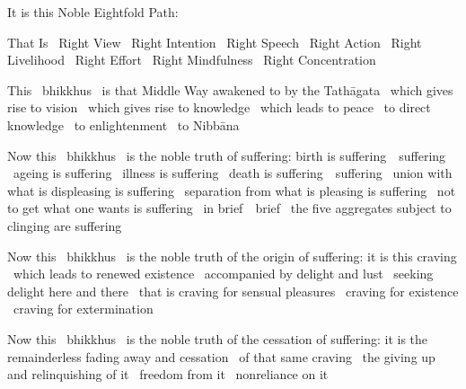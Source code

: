 \begin{english-only-hang}
  It is this Noble Eightfold Path:
\end{english-only-hang}

\begin{english-only-hang}
  That Is \breathmark\ Right View \breathmark\ Right Intention \breathmark\ Right Speech \breathmark\ Right Action \breathmark\ Right Livelihood \breathmark\ Right Effort \breathmark\ Right Mindfulness \breathmark\ Right Concentration
\end{english-only-hang}

\begin{english-only-hang}
  This \breathmark\ bhikkhus \breathmark\ is that Middle Way awakened to by the Tathāgata \breathmark\ which gives rise to vision \breathmark\ which gives rise to knowledge \breathmark\ which leads to peace \breathmark\ to direct knowledge \breathmark\ to enlightenment \breathmark\ to Nibbāna
\end{english-only-hang}

\begin{english-only-hang}
  Now this \breathmark\ bhikkhus \breathmark\ is the noble truth of suffering: birth is \ifbfiveversion \mbox{suffering}~\breathmark\ \else suffering \breathmark\ \fi ageing is suffering \breathmark\ illness is suffering \breathmark\ death is \ifbfiveversion \mbox{suffering}~\breathmark\ \else suffering \breathmark\ \fi union with what is displeasing is suffering \breathmark\ separation from what is pleasing is suffering \breathmark\ not to get what one wants is suffering \breathmark\ in \ifbfiveversion \mbox{brief}~\breathmark\ \else brief \breathmark\ \fi the five aggregates subject to clinging are suffering
\end{english-only-hang}

\begin{english-only-hang}
  Now this \breathmark\ bhikkhus \breathmark\ is the noble truth of the origin of suffering: it is this craving \breathmark\ which leads to renewed existence \breathmark\ accompanied by delight and lust \breathmark\ seeking delight here and there \breathmark\ that is craving for sensual pleasures \breathmark\ craving for existence \breathmark\ craving for extermination
\end{english-only-hang}

\begin{english-only-hang}
  Now this \breathmark\ bhikkhus \breathmark\ is the noble truth of the cessation of suffering: it is the remainderless fading away and cessation \breathmark\ of that same craving \breathmark\ the giving up and relinquishing of it \breathmark\ freedom from it \breathmark\ nonreliance on it
\end{english-only-hang}

